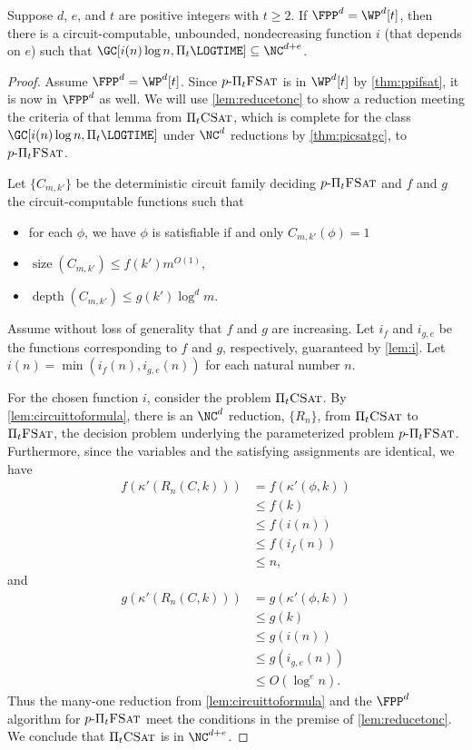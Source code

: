 \documentclass{article}
\newcommand{\dash}{\textnormal{-}}
\newcommand{\pPiFSAT}{p \dash \Pi_t \textsc{FSat}}
\newcommand{\PiFSAT}{\Pi_t \textsc{FSat}}
\newcommand{\PiCSAT}{\Pi_t \textsc{CSat}}
\DeclareMathOperator{\depth}{depth}
\DeclareMathOperator{\size}{size}
\begin{document}
\begin{theorem}
  Suppose $d$, $e$, and $t$ are positive integers with $t \geq 2$.
  If $\FPP^d = \WP^d[t]$, then there is a circuit-computable, unbounded, nondecreasing function $i$ (that depends on $e$) such that %
  $\GC[i(n) \log n, \Pi_t \LOGTIME] \subseteq \NC^{d + e}$.
\end{theorem}
\begin{proof}
  Assume $\FPP^d = \WP^d[t]$.
  Since $\pPiFSAT$ is in $\WP^d[t]$ by \autoref{thm:ppifsat}, it is now in $\FPP^d$ as well.
  We will use \autoref{lem:reducetonc} to show a reduction meeting the criteria of that lemma from $\PiCSAT$, which is complete for the class $\GC[i(n) \log n, \Pi_t \LOGTIME]$ under $\NC^d$ reductions by \autoref{thm:picsatgc}, to $\pPiFSAT$.

  Let $\{C_{m, k'}\}$ be the deterministic circuit family deciding $\pPiFSAT$ and $f$ and $g$ the circuit-computable functions such that
  \begin{itemize}
  \item for each $\phi$, we have $\phi$ is satisfiable if and only $C_{m, k'}(\phi) = 1$
  \item $\size(C_{m, k'}) \leq f(k') m^{O(1)}$,
  \item $\depth(C_{m, k'}) \leq g(k') \log^d m$.
  \end{itemize}
  Assume without loss of generality that $f$ and $g$ are increasing.
  Let $i_f$ and $i_{g, e}$ be the functions corresponding to $f$ and $g$, respectively, guaranteed by \autoref{lem:i}.
  Let $i(n) = \min(i_f(n), i_{g, e}(n))$ for each natural number $n$.

  For the chosen function $i$, consider the problem $\PiCSAT$.
  By \autoref{lem:circuittoformula}, there is an $\NC^d$ reduction, $\{R_n\}$, from $\PiCSAT$ to $\PiFSAT$, the decision problem underlying the parameterized problem $\pPiFSAT$.
  Furthermore, since the variables and the satisfying assignments are identical, we have
  \begin{align*}
    f(\kappa'(R_n(C, k))) & = f(\kappa'(\phi, k)) \\
    & \leq f(k) \\
    & \leq f(i(n)) \\
    & \leq f(i_f(n)) \\
    & \leq n,
  \end{align*}
  and
  \begin{align*}
    g(\kappa'(R_n(C, k))) & = g(\kappa'(\phi, k)) \\
    & \leq g(k) \\
    & \leq g(i(n)) \\
    & \leq g(i_{g, e}(n)) \\
    & \leq O(\log^e n).
  \end{align*}
  Thus the many-one reduction from \autoref{lem:circuittoformula} and the $\FPP^d$ algorithm for $\pPiFSAT$ meet the conditions in the premise of \autoref{lem:reducetonc}.
  We conclude that $\PiCSAT$ is in $\NC^{d + e}$.
\end{proof}
\end{document}
